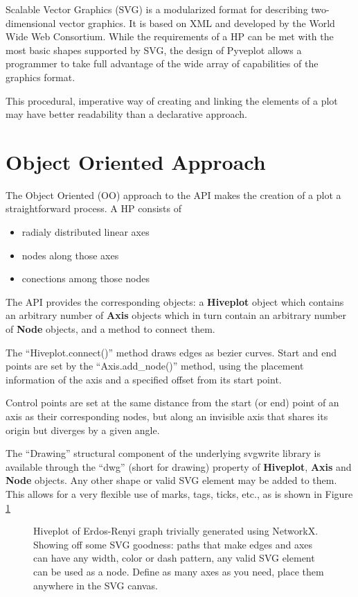 \documentclass{bioinfo}
\begin{document}
Scalable Vector Graphics (SVG) is a modularized format for describing
two-dimensional vector graphics. It is based on XML and developed by
the World Wide Web Consortium. \cite{McCormack:11:SVG} While the
requirements of a HP can be met with the most basic shapes supported
by SVG, the design of Pyveplot allows a programmer to take full
advantage of the wide array of capabilities of the graphics format.

This procedural, imperative way of creating and linking the elements of a plot may
have better readability than a declarative approach.

\section{Object Oriented Approach}

The Object Oriented (OO) approach to the API makes the creation of a
plot a straightforward process. A HP consists of
\begin{itemize}
\item radialy distributed linear axes
\item nodes along those axes
\item conections among those nodes
\end{itemize}
The API provides the corresponding objects: a {\bfseries Hiveplot} object
which contains an arbitrary number of {\bfseries Axis} objects which in
turn contain an arbitrary number of {\bfseries Node} objects, and a method
to connect them.

The ``Hiveplot.connect()'' method draws edges as bezier curves. Start and
end points are set by the ``Axis.add\_node()'' method, using the placement
information of the axis and a specified offset from its start point.

Control points are set at the same distance from the start (or end)
point of an axis as their corresponding nodes, but along an invisible
axis that shares its origin but diverges by a given angle.

The ``Drawing'' structural component of the underlying svgwrite
library is available through the ``dwg'' (short for drawing) property
of {\bfseries Hiveplot}, {\bfseries Axis} and {\bfseries Node}
objects. Any other shape or valid SVG element may be added to them.
This allows for a very flexible use of marks, tags, ticks, etc., as is
shown in Figure \ref{fig:01}

\begin{figure}[!tpb]%
  \caption{Hiveplot of Erdos-Renyi graph trivially generated using
    NetworkX. Showing off some SVG goodness: paths that make edges
    and axes can have any width, color or dash pattern, any valid SVG
    element can be used as a node. Define as many axes as you need,
    place them anywhere in the SVG canvas.}\label{fig:01}
\end{figure}
\end{document}
